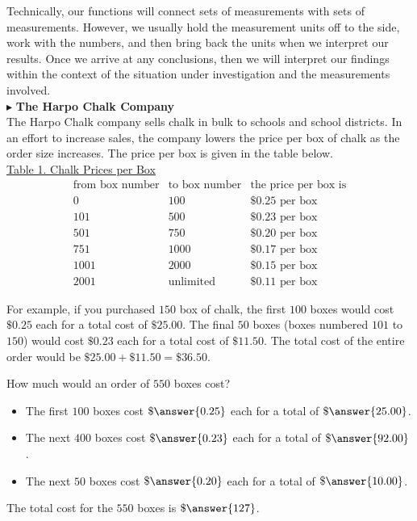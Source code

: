 \documentclass{ximera}
\begin{document}
Technically, our functions will connect sets of measurements with sets of measurements. However, we usually hold the measurement units off to the side, work with the numbers, and then bring back the units when we interpret our results.  Once we arrive at any conclusions, then we will interpret our findings within the context of the situation under investigation and the measurements involved. \\




$\blacktriangleright$ \textbf{The Harpo Chalk Company} \\

The Harpo Chalk company sells chalk in bulk to schools and school districts. In an effort to increase sales, the company lowers the price per box of chalk as the order size increases.  The price per box is given in the table below. \\




\underline{Table 1. Chalk Prices per Box}
\[
\begin{array}{lll}
\text{from box number} & \text{to box number}  & \text{the price per box is} \\
0 &  100 &  \$0.25 \text{ per box}   \\
101 &  500 &  \$0.23 \text{ per box}   \\
501 &  750 &  \$0.20 \text{ per box}   \\
751 &  1000 &  \$0.17 \text{ per box}   \\
1001 &  2000 &  \$0.15 \text{ per box}   \\
2001 &  \text{unlimited} &  \$0.11 \text{ per box}   
\end{array}
\]




For example, if you purchased $150$ box of chalk, the first $100$ boxes would cost $\$0.25$ each for a total cost of $\$25.00$.  The final $50$ boxes (boxes numbered $101$ to $150$) would cost $\$0.23$ each for a total cost of $\$11.50$.  The total cost of the entire order would be $\$25.00 + \$11.50 = \$36.50$.


\begin{question}
How much would an order of $550$ boxes cost?

\begin{explanation}

\begin{itemize}
\item The first $100$ boxes cost $\$\answer{0.25}$ each for a total of $\$\answer{25.00}$.
\item The next $400$ boxes cost $\$\answer{0.23}$ each for a total of $\$\answer{92.00}$.
\item The next $50$ boxes cost $\$\answer{0.20}$ each for a total of $\$\answer{10.00}$.
\end{itemize}

The total cost for the $550$ boxes is $\$\answer{127}$.
\end{explanation}
\end{question}
\end{document}
